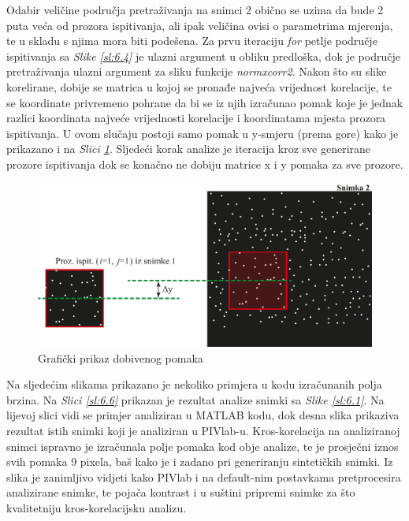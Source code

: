 \par
Odabir veličine područja pretraživanja na snimci 2 obično se uzima da bude 2 puta veća od prozora ispitivanja, ali ipak veličina ovisi o parametrima mjerenja, te u skladu s njima mora biti podešena. Za prvu iteraciju \textit{for} petlje područje ispitivanja sa \textit{Slike \ref{sl:6.4}} je ulazni argument u obliku predloška, dok je područje pretraživanja ulazni argument za sliku funkcije \textit{normxcorr2}. Nakon što su slike korelirane, dobije se matrica u kojoj se pronađe najveća vrijednost korelacije, te se koordinate privremeno pohrane da bi se iz njih izračunao pomak koje je jednak razlici koordinata najveće vrijednosti korelacije i koordinatama mjesta prozora ispitivanja. U ovom slučaju postoji samo pomak u y-smjeru (prema gore) kako je prikazano i na \textit{Slici \ref{sl:6.5}}. Sljedeći korak analize je iteracija kroz sve generirane prozore ispitivanja dok se konačno ne dobiju matrice x i y pomaka za sve prozore.
\begin{figure}[h]  
	\centering
	\includegraphics[width=13cm]{./6_PrimjerKrosKorelacije/slika6_5.pdf} 
	\caption{Grafički prikaz dobivenog pomaka}
	\label{sl:6.5}
\end{figure}
\par
Na sljedećim slikama prikazano je nekoliko primjera u kodu izračunanih polja brzina. Na \textit{Slici \ref{sl:6.6}} prikazan je rezultat analize snimki sa \textit{Slike \ref{sl:6.1}}. Na lijevoj slici vidi se primjer analiziran u MATLAB kodu, dok desna slika prikaziva rezultat istih snimki koji je analiziran u PIVlab-u. Kros-korelacija na analiziranoj snimci ispravno je izračunala polje pomaka kod obje analize, te je prosječni iznos svih pomaka 9 pixela, baš kako je i zadano pri generiranju sintetičkih snimki. Iz slika je zanimljivo vidjeti kako PIVlab i na default-nim postavkama pretprocesira analizirane snimke, te pojača kontrast i u suštini pripremi snimke za što kvalitetniju kros-korelacijsku analizu.
